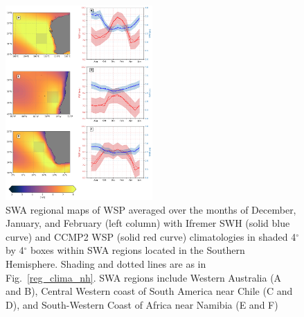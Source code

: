 \documentclass[12pt,twoside]{article}
\begin{document}
\begin{figure}[tbh]
\centering
\includegraphics[width=0.5\textwidth]{figs/regional_climatologies/paper_regional_clima_sh.png}
\caption{SWA  regional maps of WSP averaged over the months of December, January, and February (left column) with Ifremer SWH (solid blue curve) and CCMP2 WSP (solid red curve) climatologies in shaded 4$^{\circ}$ by 4$^{\circ}$ boxes within SWA regions located in the Southern Hemisphere. Shading and dotted lines are as in Fig.~\ref{reg_clima_nh}. SWA regions include Western Australia (A and B), Central Western coast of South America near Chile (C and D), and South-Western Coast of Africa near Namibia (E and F)}
\label{reg_clima_sh}
\end{figure}


\end{document}
